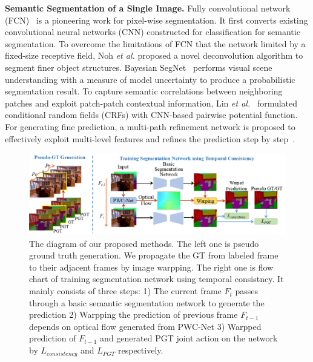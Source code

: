 \noindent \textbf{Semantic Segmentation of a Single Image.}
%
Fully convolutional network (FCN)~\cite{Long2015} is a pioneering work for pixel-wise segmentation. It first converts existing convolutional neural networks (CNN) constructed for classification for semantic segmentation.
%
To overcome the limitations of FCN that the network limited by a fixed-size receptive field, Noh \emph{et al.} \cite{Noh2015} proposed a novel deconvolution algorithm to segment finer object structures.
%
Bayesian SegNet~\cite{Kendall2015} performs visual scene understanding with a measure of model uncertainty to produce a probabilistic segmentation result.
%
To capture semantic correlations between neighboring patches and exploit patch-patch contextual information, Lin \emph{et al.}~\cite{Lin2016} formulated conditional random fields (CRFs) with CNN-based pairwise potential function. 
%
For generating fine prediction, a multi-path refinement network is proposed to effectively exploit multi-level features and refines the prediction step by step~\cite{Lin2017}.
%


\begin{figure}[htbp]
	\setlength{\abovecaptionskip}{0pt} 
	\setlength{\belowcaptionskip}{10pt}
	\centering
	\centering
	\includegraphics[scale=0.57]{figure/Pipeline.png}
	\caption{The diagram of our proposed methods. The left one is pseudo ground truth generation. We propagate the GT from labeled frame to their adjacent frames by image warpping. The right one is flow chart of training segmentation network using temporal consistncy. It mainly consists of three steps: 1) The current frame $F_t$ passes through a basic semantic segmentation network to generate the prediction  2) Warpping the prediction of previous frame $F_{t-1}$ depends on optical flow generated from PWC-Net \cite{Sun2018} 3) Warpped prediction of $F_{t-1}$ and generated PGT joint action on the network by $L_{consistency}$ and $L_{PGT}$ respectively.}
	\label{fig:Pipeline}
	\vspace*{-0.2cm}
\end{figure}
 

